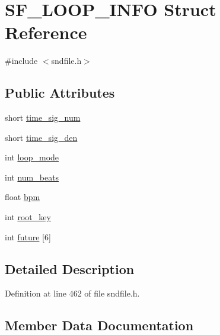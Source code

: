 \hypertarget{struct_s_f___l_o_o_p___i_n_f_o}{}\section{S\+F\+\_\+\+L\+O\+O\+P\+\_\+\+I\+N\+FO Struct Reference}
\label{struct_s_f___l_o_o_p___i_n_f_o}


{\ttfamily \#include $<$sndfile.\+h$>$}

\subsection*{Public Attributes}
\begin{DoxyCompactItemize}
\item 
short \mbox{\hyperlink{struct_s_f___l_o_o_p___i_n_f_o_a6ece67f0077c22fadbc875e0250ad656}{time\+\_\+sig\+\_\+num}}
\item 
short \mbox{\hyperlink{struct_s_f___l_o_o_p___i_n_f_o_a0a90aff8f6d4a38e70beea2ee589df8e}{time\+\_\+sig\+\_\+den}}
\item 
int \mbox{\hyperlink{struct_s_f___l_o_o_p___i_n_f_o_a4e33720922b6aeca9e7b6dbea3c102ca}{loop\+\_\+mode}}
\item 
int \mbox{\hyperlink{struct_s_f___l_o_o_p___i_n_f_o_a5e73babc2985c7a94fc81349fb6d8e38}{num\+\_\+beats}}
\item 
float \mbox{\hyperlink{struct_s_f___l_o_o_p___i_n_f_o_a262bdf39e1df370c52671b5147c81924}{bpm}}
\item 
int \mbox{\hyperlink{struct_s_f___l_o_o_p___i_n_f_o_a2755451bf6c64d3c0f8202d7e427f6b8}{root\+\_\+key}}
\item 
int \mbox{\hyperlink{struct_s_f___l_o_o_p___i_n_f_o_afb3ef90efaaa811d6748854b3830196d}{future}} \mbox{[}6\mbox{]}
\end{DoxyCompactItemize}


\subsection{Detailed Description}


Definition at line 462 of file sndfile.\+h.



\subsection{Member Data Documentation}
\mbox{\label{struct_s_f___l_o_o_p___i_n_f_o_a262bdf39e1df370c52671b5147c81924}} 

